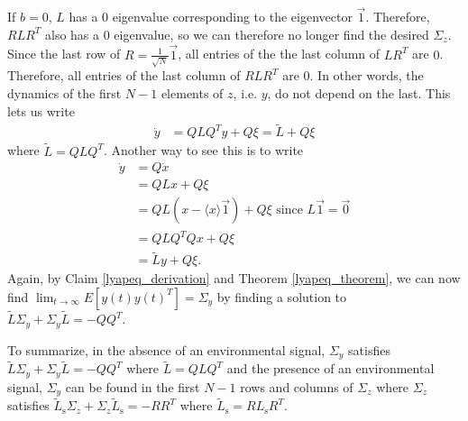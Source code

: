 \documentclass{article}
\begin{document}
If $b=0$, $L$ has a $0$ eigenvalue corresponding to the eigenvector $\vec{1}$. Therefore, $RLR^T$ also has a $0$ eigenvalue, so we can therefore no longer find the desired $\Sigma_z$.  Since the last row of $R=\frac{1}{\sqrt{N}}\vec{1}$, all entries of the the last column of $LR^T$ are $0$. Therefore, all entries of the last column of $RLR^T$ are $0$. In other words, the dynamics of the first $N-1$ elements of $z$, i.e. $y$, do not depend on the last. This lets us write 
\begin{align*}
\dot{y}&=QLQ^Ty+Q\xi=\tilde{L}+Q\xi
\end{align*}
where $\tilde{L}=QLQ^T$. Another way to see this is to write 
\begin{align*}
 \dot{y}&=Q\dot{x}
 \\ &=QLx+Q\xi
 \\&=QL(x-\langle x\rangle \vec{1})+Q\xi \text{ since $L\vec{1}=\vec{0}$}
 \\&=QLQ^TQx+Q\xi
 \\&=\tilde{L}y+Q\xi.
\end{align*}
Again, by Claim \ref{lyapeq_derivation} and Theorem \ref{lyapeq_theorem}, we can now find $\lim_{t\to\infty}E[y(t)y(t)^T]=\Sigma_y$ by finding a solution to $\tilde{L}\Sigma_y+\Sigma_y\tilde{L}=-QQ^T$. 

To summarize, in the absence of an environmental signal, $\Sigma_y$ satisfies $\tilde{L}\Sigma_y+\Sigma_y\tilde{L}=-QQ^T$ where $\tilde{L}=QLQ^T$ and the presence of an environmental signal, $\Sigma_y$ can be found in the first $N-1$ rows and columns of $\Sigma_z$ where $\Sigma_z$ satisfies $\tilde{L}_\text{s}\Sigma_z+\Sigma_z\tilde{L}_\text{s}=-RR^T$ where $\tilde{L}_\text{s}=RL_\text{s}R^T$.
\end{document}
